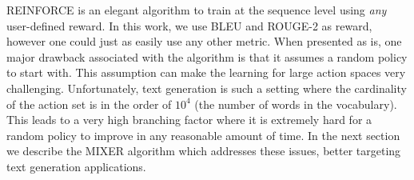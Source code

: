 REINFORCE is an elegant algorithm to train at the sequence level using {\em any} user-defined reward. In this work, we use BLEU and ROUGE-2 as reward, however one could just as easily use any other metric.
When presented as is, one major drawback associated with the algorithm is that it assumes a random
policy to start with. This assumption can make the learning for large action spaces very challenging.
Unfortunately, text generation is such a setting where the cardinality of the action set is in the order of $10^4$ (the number of words in the vocabulary). 
This leads to a very high branching factor where it is extremely hard for a random policy to improve in any reasonable amount of time. 
In the next section we describe the MIXER algorithm which addresses these issues, better targeting
text generation applications.

